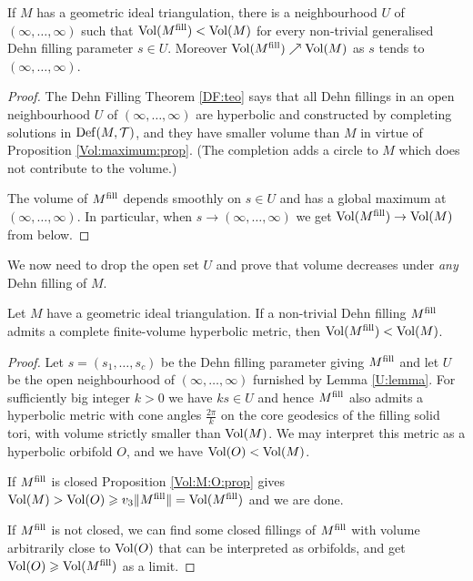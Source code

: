 \begin{lemma} \label{U:lemma}
If $M$ has a geometric ideal triangulation, there is a neighbourhood $U$ of $(\infty,\ldots, \infty)$ such that ${\rm Vol}(M^{\rm fill})< {\rm Vol}(M)$ for every non-trivial generalised Dehn filling parameter $s\in U$. Moreover ${\rm Vol}(M^{\rm fill}) \nearrow {\rm Vol}(M)$ as $s$ tends to $(\infty, \ldots, \infty)$.
\end{lemma}
\begin{proof}
The Dehn Filling Theorem \ref{DF:teo} says that all Dehn fillings in an open neighbourhood $U$ of $(\infty,\ldots,\infty)$ are hyperbolic and constructed by completing solutions in ${\rm Def}(M,\mathcal{T})$, and they have smaller volume than $M$ in virtue of Proposition \ref{Vol:maximum:prop}. (The completion adds a circle to $M$ which does not contribute to the volume.)

The volume of $M^{\rm fill}$ depends smoothly on $s\in U$ and has a global maximum at $(\infty,\ldots,\infty)$. In particular, when $s\to (\infty, \ldots, \infty)$ we get ${\rm Vol}(M^{\rm fill}) \to {\rm Vol}(M)$ from below.
\end{proof}

We now need to drop the open set $U$ and prove that volume decreases under \emph{any} Dehn filling of $M$. 

\begin{lemma} \label{strict:everywhere:lemma}
Let $M$ have a geometric ideal triangulation. If a non-trivial Dehn filling $M^{\rm fill}$ admits a complete finite-volume hyperbolic metric, then ${\rm Vol}(M^{\rm fill}) < {\rm Vol}(M)$.
\end{lemma}
\begin{proof}
Let $s=(s_1,\ldots, s_c)$ be the Dehn filling parameter giving $M^{\rm fill}$ and let
$U$ be the open neighbourhood of $(\infty,\ldots, \infty)$ furnished by Lemma \ref{U:lemma}. For sufficiently big integer $k>0$ we have $ks \in U$ and hence $M^{\rm fill}$ also admits a hyperbolic metric with cone angles $\frac{2\pi}k$ on the core geodesics of the filling solid tori, with volume strictly smaller than ${\rm Vol}(M)$. We may interpret this metric as a hyperbolic orbifold $O$, and we have ${\rm Vol}(O)<{\rm Vol}(M)$.

If $M^{\rm fill}$ is closed Proposition \ref{Vol:M:O:prop} gives ${\rm Vol}(M) > {\rm Vol}(O) \geqslant v_3\|M^{\rm fill}\| = {\rm Vol}(M^{\rm fill})$ and we are done.

If $M^{\rm fill}$ is not closed, we can find some closed fillings of $M^{\rm fill}$ with volume arbitrarily close to ${\rm Vol}(O)$ that can be interpreted as orbifolds, and get ${\rm Vol}(O)\geqslant {\rm Vol}(M^{\rm fill})$ as a limit.
\end{proof}

